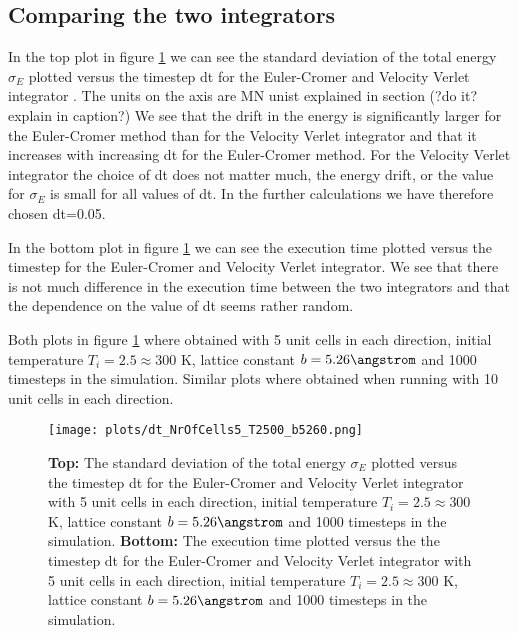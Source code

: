 \documentclass[11pt,a4wide]{article}
\begin{document}
\subsection{Comparing the two integrators} \label{sec: integrators_results}

In the top plot in figure \ref{fig: dt} we can see the standard deviation of the total energy $\sigma_E$ plotted versus the timestep dt for the Euler-Cromer and Velocity Verlet integrator . The units on the axis are MN unist explained in section (?do it? explain in caption?) We see that the drift in the energy is significantly larger for the Euler-Cromer method than for the Velocity Verlet integrator and that it increases with increasing dt for the Euler-Cromer method. For the Velocity Verlet integrator the choice of dt does not matter much, the energy drift, or the value for $\sigma_E$ is small for all values of dt. In the further calculations we have therefore chosen dt=0.05.  

In the bottom plot in figure \ref{fig: dt} we can see the execution time plotted versus the timestep for the Euler-Cromer and Velocity Verlet integrator. We see that there is not much difference in the execution time between the two integrators and that the dependence on the value of dt seems rather random. 

Both plots in figure \ref{fig: dt} where obtained with 5 unit cells in each direction, initial temperature $T_i = 2.5 \approx 300$ K, lattice constant $b=5.26 \angstrom$ and 1000 timesteps in the simulation. Similar plots where obtained when running with 10 unit cells in each direction. 

\begin{figure}[htp]
\centering
\texttt{[image: plots/dt\_NrOfCells5\_T2500\_b5260.png]}
\caption{\textbf{Top:} The standard deviation of the total energy $\sigma_E$ plotted versus the timestep dt for the Euler-Cromer and Velocity Verlet integrator with 5 unit cells in each direction, initial temperature $T_i = 2.5 \approx 300$ K, lattice constant $b=5.26 \angstrom$ and 1000 timesteps in the simulation. \textbf{Bottom:} The execution time plotted versus the the timestep dt for the Euler-Cromer and Velocity Verlet integrator with 5 unit cells in each direction, initial temperature $T_i = 2.5 \approx 300$ K, lattice constant $b=5.26 \angstrom$ and 1000 timesteps in the simulation.}
\label{fig: dt}
\end{figure}
\end{document}
